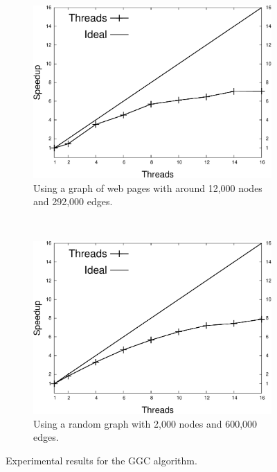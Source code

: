 \newcommand{\plotsize}{0.38\textwidth}

\begin{figure}[t]
   \centering
   \begin{subfigure}[b]{\plotsize}
      \includegraphics[width=\textwidth]{speedup_greedy-graph-coloring-search_engines.pdf}
      \caption{Using a graph of web pages with around 12,000 nodes and 292,000 edges.}
   \end{subfigure}
   ~~
   \begin{subfigure}[b]{\plotsize}
      \includegraphics[width=\textwidth]{speedup_greedy-graph-coloring-2000.pdf}
      \caption{Using a random graph with 2,000 nodes and 600,000 edges.}
   \end{subfigure}
   \caption{Experimental results for the GGC algorithm.}
   \label{exp:graph_coloring}
\end{figure}

